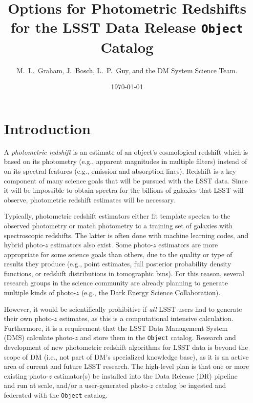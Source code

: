 \documentclass[DM,lsstdraft,toc]{lsstdoc}
\title[Photo-$z$ for LSST Objects]{Options for Photometric Redshifts for the LSST Data Release {\tt Object} Catalog}
\author{M.~L.~Graham, J.~Bosch, L.~P.~Guy, and the DM System Science Team.}
\date{\today}
\begin{document}
\maketitle




\section{Introduction} \label{sec:intro}

A {\it photometric redshift} is an estimate of an object's cosmological redshift which is based on its photometry (e.g., apparent magnitudes in multiple filters) instead of on its spectral features (e.g., emission and absorption lines). 
Redshift is a key component of many science goals that will be pursued with the LSST data.
Since it will be impossible to obtain spectra for the billions of galaxies that LSST will observe, photometric redshift estimates will be necessary.

Typically, photometric redshift estimators either fit template spectra to the observed photometry or match photometry to a training set of galaxies with spectroscopic redshifts. 
The latter is often done with machine learning codes, and hybrid photo-$z$ estimators also exist. 
Some photo-$z$ estimators are more appropriate for some science goals than others, due to the quality or type of results they produce (e.g., point estimates, full posterior probability density functions, or redshift distributions in tomographic bins).
For this reason, several research groups in the science community are already planning to generate multiple kinds of photo-$z$ (e.g., the Dark Energy Science Collaboration).

However, it would be scientifically prohibitive if \emph{all} LSST users had to generate their own photo-$z$ estimates, as this is a computational intensive calculation.
Furthermore, it is a requirement that the LSST Data Management System (DMS) calculate photo-$z$ and store them in the {\tt Object} catalog.
Research and development of new photometric redshift algorithms for LSST data is beyond the scope of DM (i.e., not part of DM's specialized knowledge base), as it is an active area of current and future LSST research.
The high-level plan is that one or more existing photo-$z$ estimator(s) be installed into the Data Release (DR) pipeline and run at scale, and/or a user-generated photo-$z$ catalog be ingested and federated with the {\tt Object} catalog.
\end{document}
